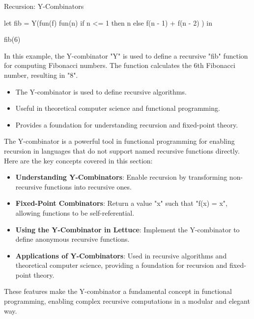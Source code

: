 \begin{notes}{Recursion: Y-Combinators}
\begin{highlight}
\begin{code}[Lettuce]
    let fib = Y(fun(f) {
        fun(n) {
            if n <= 1 then n else f(n - 1) + f(n - 2)
        }
    }) in
    
    fib(6)
    \end{code}
    
        In this example, the Y-combinator "Y" is used to define a recursive "fib" function for computing Fibonacci numbers. The function calculates the 6th Fibonacci number, resulting in "8".
    
        \begin{itemize}
            \item The Y-combinator is used to define recursive algorithms.
            \item Useful in theoretical computer science and functional programming.
            \item Provides a foundation for understanding recursion and fixed-point theory.
        \end{itemize}
    
    \end{highlight}
    
    \begin{highlight}
    
        The Y-combinator is a powerful tool in functional programming for enabling recursion in languages that do not support named recursive functions directly. Here are the key concepts covered in this section:
    
        \begin{itemize}
            \item \textbf{Understanding Y-Combinators}: Enable recursion by transforming non-recursive functions into recursive ones.
            \item \textbf{Fixed-Point Combinators}: Return a value "x" such that "f(x) = x", allowing functions to be self-referential.
            \item \textbf{Using the Y-Combinator in Lettuce}: Implement the Y-combinator to define anonymous recursive functions.
            \item \textbf{Applications of Y-Combinators}: Used in recursive algorithms and theoretical computer science, providing a foundation for recursion and fixed-point theory.
        \end{itemize}
    
        These features make the Y-combinator a fundamental concept in functional programming, enabling complex recursive computations in a modular and elegant way.
    
    \end{highlight}
\end{notes}